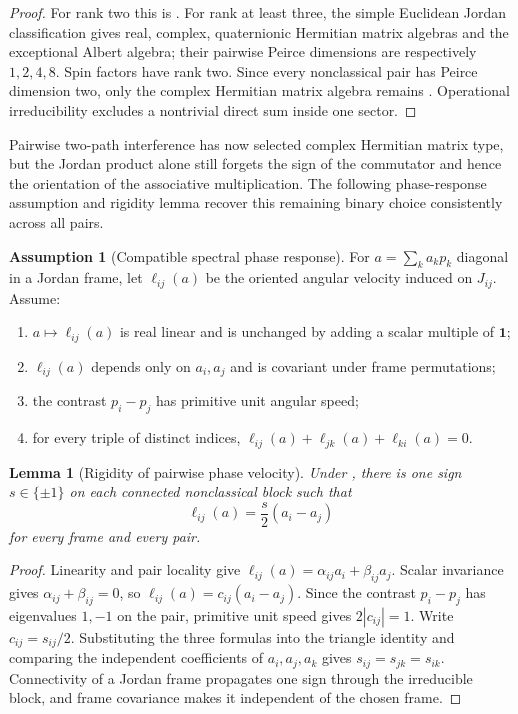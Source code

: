 \documentclass[11pt]{article}
\newtheorem{lemma}[theorem]{Lemma}
\theoremstyle{definition}
\newtheorem{assumption}{Assumption}[section]
\theoremstyle{remark}
\newcommand{\one}{\mathbf 1}
\begin{document}
\begin{proof}
For rank two this is .  For rank at least three,
the simple Euclidean Jordan classification gives real, complex, quaternionic
Hermitian matrix algebras and the exceptional Albert algebra; their pairwise
Peirce dimensions are respectively $1,2,4,8$.  Spin factors have rank two.
Since every nonclassical pair has Peirce dimension two, only the complex
Hermitian matrix algebra remains
\cite{JordanVonNeumannWigner1934}.  Operational irreducibility excludes a
nontrivial direct sum inside one sector.
\end{proof}

Pairwise two-path interference has now selected complex Hermitian matrix type, but
the Jordan product alone still forgets the sign of the commutator and hence the
orientation of the associative multiplication.  The following phase-response
assumption and rigidity lemma recover this remaining binary choice consistently
across all pairs.

\begin{assumption}[Compatible spectral phase response]
\label{ass:pair-phase-response}
For $a=\sum_k a_kp_k$ diagonal in a Jordan frame, let
$\ell_{ij}(a)$ be the oriented angular velocity induced on $J_{ij}$.  Assume:
\begin{enumerate}[label=\textup{(P\arabic*)},leftmargin=2.8em]
\item $a\mapsto\ell_{ij}(a)$ is real linear and is unchanged by adding a scalar
      multiple of $\one$;
\item $\ell_{ij}(a)$ depends only on $a_i,a_j$ and is covariant under frame
      permutations;
\item the contrast $p_i-p_j$ has primitive unit angular speed;
\item for every triple of distinct indices,
      $\ell_{ij}(a)+\ell_{jk}(a)+\ell_{ki}(a)=0$.
\end{enumerate}
\end{assumption}

\begin{lemma}[Rigidity of pairwise phase velocity]
\label{lem:phase-velocity}
Under , there is one sign $s\in\{\pm1\}$ on each
connected nonclassical block such that
\[
 \ell_{ij}(a)=\frac{s}{2}(a_i-a_j)
\]
for every frame and every pair.
\end{lemma}

\begin{proof}
Linearity and pair locality give
$\ell_{ij}(a)=\alpha_{ij}a_i+\beta_{ij}a_j$.  Scalar invariance gives
$\alpha_{ij}+\beta_{ij}=0$, so
$\ell_{ij}(a)=c_{ij}(a_i-a_j)$.  Since the contrast $p_i-p_j$ has eigenvalues
$1,-1$ on the pair, primitive unit speed gives $2|c_{ij}|=1$.  Write
$c_{ij}=s_{ij}/2$.  Substituting the three formulas into the triangle identity
and comparing the independent coefficients of $a_i,a_j,a_k$ gives
$s_{ij}=s_{jk}=s_{ik}$.  Connectivity of a Jordan frame propagates one sign
through the irreducible block, and frame covariance makes it independent of the
chosen frame.
\end{proof}
\end{document}
